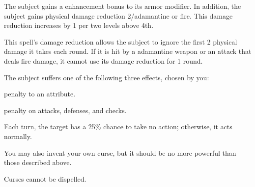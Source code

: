 \spelldur{\durshort}
\begin{spelleffect}
  The subject gains a  enhancement bonus to its armor modifier. \bonusscalingdescription In addition, the subject gains physical damage reduction 2/adamantine or fire. This damage reduction increases by 1 per two levels above 4th.
\end{spelleffect}
\begin{spellnotes}
  This spell's damage reduction allows the subject to ignore the first 2 physical damage it takes each round. If it is hit by a adamantine weapon or an attack that deals fire damage, it cannot use its damage reduction for 1 round.
\end{spellnotes}

\spellrng{\rngclose}
\begin{spelleffect}
  The subject suffers one of the following three effects, chosen by you:
  \begin{itemize*}
    \item {} penalty to an attribute.
    \item {} penalty on attacks, defenses, and checks.
    \item Each turn, the target has a 25\% chance to take no action; otherwise, it acts normally.
  \end{itemize*}
  \par You may also invent your own curse, but it should be no more powerful than those described above.
\end{spelleffect}
\begin{spellnotes}
  Curses cannot be dispelled.
\end{spellnotes}

